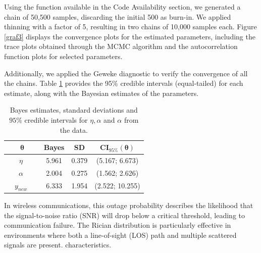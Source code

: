 \documentclass[12pt]{interact}
\theoremstyle{plain}%
\theoremstyle{definition}
\theoremstyle{remark}
\begin{document}
 Using the function available in the Code Availability section, we generated a chain of 50,500 samples, discarding the initial 500 as burn-in. We applied thinning with a factor of 5, resulting in two chains of 10,000 samples each. Figure \ref{graf3} displays the convergence plots for the estimated parameters, including the trace plots obtained through the MCMC algorithm and the autocorrelation function plots for selected parameters.



Additionally, we applied the Geweke diagnostic to verify the convergence of all the chains. Table \ref{tablem2} provides the 95\% credible intervals (equal-tailed) for each estimate, along with the Bayesian estimates of the parameters.
\begin{table}[!ht]
\caption{Bayes estimates, standard deviations and $95\%$ credible intervals for $\eta,\alpha$ and $\alpha$ from the data.}
\centering %
\begin{center}
  \begin{tabular}{ c | c | c | c}
    \hline
		$\boldsymbol{\theta}$  & Bayes & SD & CI$_{95\%}(\boldsymbol{\theta})$ \\ \hline
    \ \ $\eta$ \ \   & 5.961 & 0.379  & (5.167; 6.673) \\ \hline
    \ \ $\alpha$   \ \  & 2.004 & 0.275  & (1.562; 2.626) \\ \hline
     \ \ $y_{new}$   \ \  & 6.333 & 1.954  & (2.522; 10.255) \\ \hline
  \end{tabular}\label{tablem2}
\end{center}
\end{table}


In wireless communications, this outage probability describes the likelihood that the signal-to-noise ratio (SNR) will drop below a critical threshold, leading to communication failure. The Rician distribution is particularly effective in environments where both a line-of-sight (LOS) path and multiple scattered signals are present. characteristics.
\end{document}
